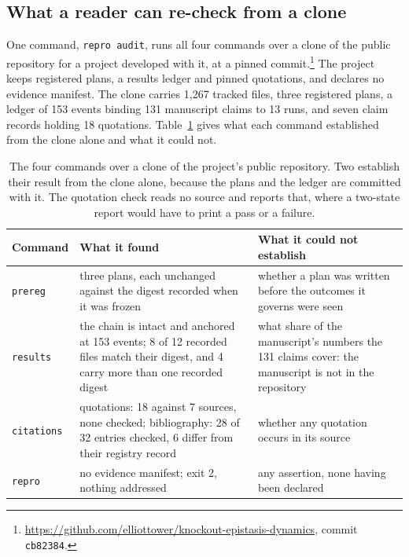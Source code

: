 \documentclass{article}
\newcommand{\code}[1]{\texttt{#1}}
\newcommand{\tPlan}{\code{prereg}}
\newcommand{\tRun}{\code{results}}
\newcommand{\tCite}{\code{citations}}
\newcommand{\tVerify}{\code{repro}}
\begin{document}
\subsection{What a reader can re-check from a clone}
\label{sec:comparative}

One command, \code{repro audit}, runs all four commands over a clone of the public repository for a
project developed with it, at a pinned commit.\footnote{\url{https://github.com/elliottower/knockout-epistasis-dynamics},
commit \code{cb82384}.} The project keeps registered plans, a results ledger and pinned quotations,
and declares no evidence manifest. The clone carries 1{,}267 tracked files, three registered
plans, a ledger of 153 events binding 131 manuscript claims to 13 runs, and seven claim records
holding 18 quotations. Table~\ref{tab:audit} gives what each command established from the clone
alone and what it could not.

\begin{table}[h]
\centering
\small
\caption{The four commands over a clone of the project's public repository. Two establish their result
from the clone alone, because the plans and the ledger are committed with it. The quotation check
reads no source and reports that, where a two-state report would have to print a pass or a
failure.}
\label{tab:audit}
\begin{tabular}{@{}>{\raggedright\arraybackslash}p{}>{\raggedright\arraybackslash}p{}>{\raggedright\arraybackslash}p{}@{}}
\toprule
\textbf{Command} & \textbf{What it found} & \textbf{What it could not establish} \\
\midrule
\tPlan{} & three plans, each unchanged against the digest recorded when it was frozen & whether a plan was written before the outcomes it governs were seen \\
\tRun{} & the chain is intact and anchored at 153 events; 8 of 12 recorded files match their digest, and 4 carry more than one recorded digest & what share of the manuscript's numbers the 131 claims cover: the manuscript is not in the repository \\
\tCite{} & quotations: 18 against 7 sources, none checked; bibliography: 28 of 32 entries checked, 6 differ from their registry record & whether any quotation occurs in its source \\
\tVerify{} & no evidence manifest; exit 2, nothing addressed & any assertion, none having been declared \\
\bottomrule
\end{tabular}
\end{table}
\end{document}

